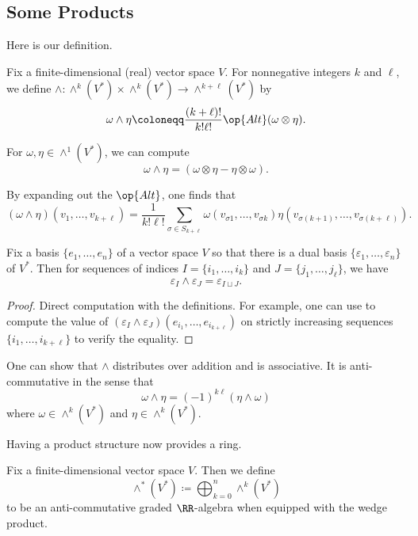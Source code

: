 \documentclass[../notes.tex]{subfiles}
\begin{document}
\subsection{Some Products}
Here is our definition.
\begin{definition}
	Fix a finite-dimensional (real) vector space $V$. For nonnegative integers $k$ and $\ell$, we define $\land\colon\land^k(V^*)\times\land^k(V^*)\to\land^{k+\ell}(V^*)$ by
	\[\omega\land\eta\coloneqq\frac{(k+\ell)!}{k!\ell!}\op{Alt}(\omega\otimes\eta).\]
\end{definition}
\begin{example}
	For $\omega,\eta\in\land^1(V^*)$, we can compute
	\[\omega\land\eta=(\omega\otimes\eta-\eta\otimes\omega).\]
\end{example}
\begin{remark} \label{rem:explicit-wedge}
	By expanding out the $\op{Alt}$, one finds that
	\[(\omega\land\eta)(v_1,\ldots,v_{k+\ell})=\frac1{k!\ell!}\sum_{\sigma\in S_{k+\ell}}\omega(v_{\sigma1},\ldots,v_{\sigma k})\eta(v_{\sigma(k+1)},\ldots,v_{\sigma(k+\ell)}).\]
\end{remark}
\begin{lemma}
	Fix a basis $\{e_1,\ldots,e_n\}$ of a vector space $V$ so that there is a dual basis $\{\varepsilon_1,\ldots,\varepsilon_n\}$ of $V^*$. Then for sequences of indices $I=\{i_1,\ldots,i_k\}$ and $J=\{j_1,\ldots,j_\ell\}$, we have
	\[\varepsilon_I\land\varepsilon_J=\varepsilon_{I\sqcup J}.\]
\end{lemma}
\begin{proof}
	Direct computation with the definitions. For example, one can use  to compute the value of $\left(\varepsilon_I\land\varepsilon_J\right)(e_{i_1},\ldots,e_{i_{k+\ell}})$ on strictly increasing sequences $\{i_1,\ldots,i_{k+\ell}\}$ to verify the equality.
\end{proof}
\begin{remark}
	One can show that $\land$ distributes over addition and is associative. It is anti-commutative in the sense that
	\[\omega\land\eta=(-1)^{k\ell}(\eta\land\omega)\]
	where $\omega\in\land^k(V^*)$ and $\eta\in\land^k(V^*)$.
\end{remark}
Having a product structure now provides a ring.
\begin{definition}
	Fix a finite-dimensional vector space $V$. Then we define
	\[\land^*(V^*)\coloneqq\bigoplus_{k=0}^n\land^k(V^*)\]
	to be an anti-commutative graded $\RR$-algebra when equipped with the wedge product.
\end{definition}
\end{document}
